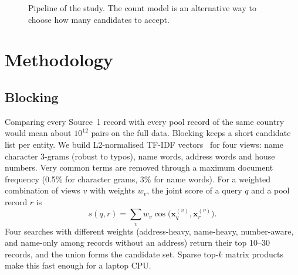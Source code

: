 \begin{figure}[t]
\centering
{}
\caption{Pipeline of the study. The count model is an alternative way to choose how many candidates to accept.}
\label{fig:pipeline}
\end{figure}

\section{Methodology}
\subsection{Blocking}
Comparing every Source~1 record with every pool record of the same country would mean about $10^{12}$ pairs on
the full data. Blocking keeps a short candidate list per entity. We build L2-normalised TF-IDF
vectors~\cite{salton1988} for four views: name character 3-grams (robust to typos), name words, address words and
house numbers. Very common terms are removed through a maximum document frequency (0.5\% for character
grams, 3\% for name words). For a weighted combination of views $v$ with weights $w_v$, the joint score of a
query $q$ and a pool record $r$ is
\begin{equation}
s(q,r)=\sum_{v} w_v \cos\!\big(\mathbf{x}^{(v)}_q,\mathbf{x}^{(v)}_r\big).
\end{equation}
Four searches with different weights (address-heavy, name-heavy, number-aware, and name-only among records without
an address) return their top 10--30 records, and the union forms the candidate set. Sparse top-$k$ matrix products
make this fast enough for a laptop CPU.

